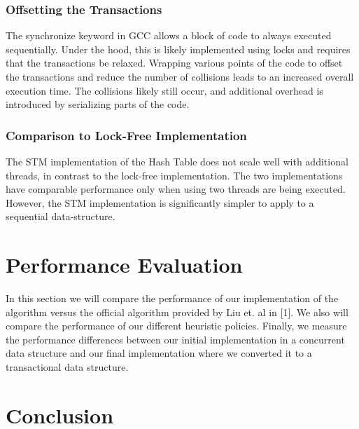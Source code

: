 \documentclass[11pt]{article} %
\begin{document}
\subsubsection{Offsetting the Transactions}

The synchronize keyword in GCC allows a block of code to always executed sequentially. Under the hood, this is likely implemented using locks and requires that the transactions be relaxed. Wrapping various points of the code to offset the transactions and reduce the number of collisions leads to an increased overall execution time. The collisions likely still occur, and additional overhead is introduced by serializing parts of the code.

\subsubsection{Comparison to Lock-Free Implementation}

The STM implementation of the Hash Table does not scale well with additional threads, in contrast to the lock-free implementation. The two implementations have comparable performance only when using two threads are being executed. However, the STM implementation is significantly simpler to apply to a sequential data-structure.

\section{Performance Evaluation}

In this section we will compare the performance of our implementation of the algorithm versus the official algorithm provided by Liu et. al in [1]. We also will compare the performance of our different heuristic policies. Finally, we measure the performance differences between our initial implementation in a concurrent data structure and our final implementation where we converted it to a transactional data structure.

\section{Conclusion}
\end{document}

